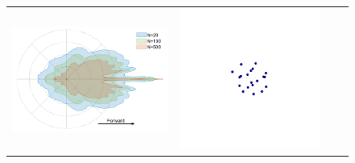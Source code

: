 \begin{figure}
    \centering
    \setlength{\resLen}{0.8in}
    \addtolength{\tabcolsep}{-3pt}
    \begin{tabular}{cccc}
        \includegraphics[width=\resLen]{images/pfunc/number.png} &
        \includegraphics[width=\resLen]{images/particle/validate8_D2_N20_500nm.png} &

\end{tabular}
\end{figure}
